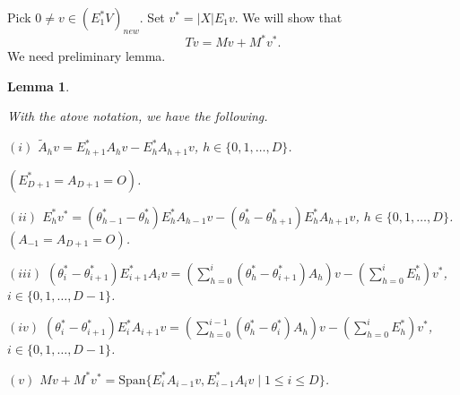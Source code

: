 \documentclass[
]{book}
\newtheorem{lemma}{Lemma}[chapter]
\theoremstyle{definition}
\theoremstyle{definition}
\theoremstyle{definition}
\theoremstyle{definition}
\theoremstyle{remark}
\begin{document}
Pick \(0\neq v\in (E^*_1V)_{new}\). Set \(v^* = |X|E_1v\). We will show that
\[Tv = Mv + M^*v^*.\]
We need preliminary lemma.

\begin{lemma}
\protect\hypertarget{lem:mvplusmstarvstar}{}\label{lem:mvplusmstarvstar}

With the atove notation, we have the following.

\((i)\) \(\tilde{A}_hv = E^*_{h+1}A_hv - E^*_hA_{h+1}v\), \(h\in \{0, 1, \ldots, D\}\).

\((E^*_{D+1} = A_{D+1} = O)\).

\((ii)\) \(E^*_hv^* = (\theta^*_{h-1}-\theta^*_h)E^*_hA_{h-1}v - (\theta^*_h-\theta^*_{h+1})E^*_hA_{h+1}v\), \(h\in \{0, 1, \ldots, D\}\). \((A_{-1} = A_{D+1} = O)\).

\((iii)\) \({\displaystyle (\theta^*_i-\theta^*_{i+1})E^*_{i+1}A_iv = \left(\sum_{h=0}^i (\theta^*_h-\theta^*_{i+1})A_h\right)v - \left(\sum_{h=0}^i E^*_h\right)v^*}\), \(i\in \{0,1, \ldots, D-1\}\).

\((iv)\) \({\displaystyle (\theta^*_i-\theta^*_{i+1})E^*_{i}A_{i+1}v = \left(\sum_{h=0}^{i-1}(\theta^*_h-\theta^*_{i})A_h\right)v - \left(\sum_{h=0}^i E^*_h\right)v^*}\), \(i\in \{0,1, \ldots, D-1\}\).

\((v)\) \(Mv + M^*v^* = \mathrm{Span}\{E^*_iA_{i-1}v, E^*_{i-1}A_iv \mid 1\leq i\leq D\}\).

\end{lemma}
\end{document}
